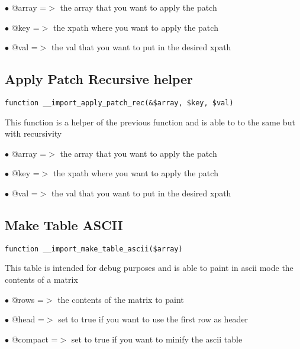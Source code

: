 \documentclass[a4paper]{book}
\begin{document}
\begin{compactitem}
\item[\color{myblue}$\bullet$] @array =$>$ the array that you want to apply the patch
\item[\color{myblue}$\bullet$] @key   =$>$ the xpath where you want to apply the patch
\item[\color{myblue}$\bullet$] @val   =$>$ the val that you want to put in the desired xpath
\end{compactitem}

\hypertarget{toc173}{}
\subsection{Apply Patch Recursive helper}

\begin{lstlisting}
function __import_apply_patch_rec(&$array, $key, $val)
\end{lstlisting}

This function is a helper of the previous function and is able to to the
same but with recursivity

\begin{compactitem}
\item[\color{myblue}$\bullet$] @array =$>$ the array that you want to apply the patch
\item[\color{myblue}$\bullet$] @key   =$>$ the xpath where you want to apply the patch
\item[\color{myblue}$\bullet$] @val   =$>$ the val that you want to put in the desired xpath
\end{compactitem}

\hypertarget{toc174}{}
\subsection{Make Table ASCII}

\begin{lstlisting}
function __import_make_table_ascii($array)
\end{lstlisting}

This table is intended for debug purposes and is able to paint in ascii
mode the contents of a matrix

\begin{compactitem}
\item[\color{myblue}$\bullet$] @rows    =$>$ the contents of the matrix to paint
\item[\color{myblue}$\bullet$] @head    =$>$ set to true if you want to use the first row as header
\item[\color{myblue}$\bullet$] @compact =$>$ set to true if you want to minify the ascii table
\end{compactitem}
\end{document}
